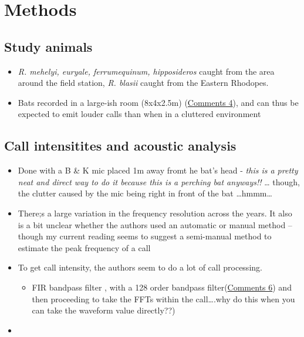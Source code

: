 \documentclass[
]{book}
\providecommand{\tightlist}{%
  \setlength{\itemsep}{0pt}\setlength{\parskip}{0pt}}
\begin{document}
\hypertarget{methods-7}{%
\section{Methods}\label{methods-7}}

\hypertarget{study-animals}{%
\subsection{Study animals}\label{study-animals}}

\begin{itemize}
\tightlist
\item
  \emph{R. mehelyi, euryale, ferrumequinum, hipposideros} caught from the area around the field station, \emph{R. blasii} caught from the Eastern Rhodopes.
\item
  Bats recorded in a large-ish room (8x4x2.5m) (\protect\hyperlink{com_shuchsiem}{Comments 4}), and can thus be expected to emit louder calls than when in a cluttered environment
\end{itemize}

\hypertarget{call-intensitites-and-acoustic-analysis}{%
\subsection{Call intensitites and acoustic analysis}\label{call-intensitites-and-acoustic-analysis}}

\begin{itemize}
\item
  Done with a B \& K mic placed 1m away fromt he bat's head - \emph{this is a pretty neat and direct way to do it because this is a perching bat anyways!!} \ldots{} though, the clutter caused by the mic being right in front of the bat \ldots hmmm\ldots{}
\item
  There;s a large variation in the frequency resolution across the years. It also is a bit unclear whether the authors used an automatic or manual method -- though my current reading seems to suggest a semi-manual method to estimate the peak frequency of a call
\item
  To get call intensity, the authors seem to do a lot of call processing.

  \begin{itemize}
  \tightlist
  \item
    FIR bandpass filter , with a 128 order bandpass filter(\protect\hyperlink{com_shuchsiem}{Comments 6}) and then proceeding to take the FFTs within the call\ldots.why do this when you can take the waveform value directly??)
  \end{itemize}
\item
\end{itemize}
\end{document}
